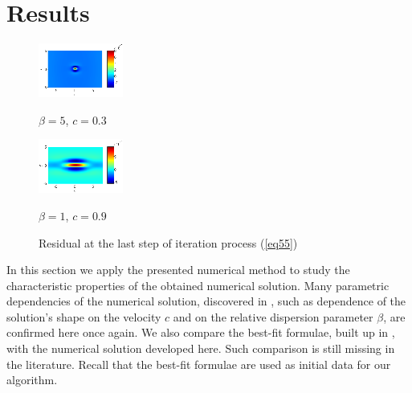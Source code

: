 \documentclass[preprint]{elsarticle}
\newcommand{\rf}[1]{(\ref{#1})}
\begin{document}
\section{Results}\label{results}
\begin{figure}[htbp]
	\begin{minipage}[b]{0.5\linewidth}
		 \centering
		\includegraphics[width=\linewidth]{residual/residual_bt5c03.eps}
		\centerline{$\beta = 5$, $c = 0.3$}
	\end{minipage}	
	\begin{minipage}[b]{0.5\linewidth}
		\centering
		 \includegraphics[width=\linewidth]{residual/residual_bt1c09.eps}
	\centerline{$\beta = 1$, $c = 0.9$ }
	\end{minipage}
		\caption{Residual at the last step of iteration process \rf{eq55} }
		\label{resid}
\end{figure}
In this section we apply the presented  numerical method  to study the characteristic properties of the obtained numerical solution.  Many parametric dependencies of the numerical solution,  discovered in \cite{Ch2011,Ch2012}, such as dependence of the solution's shape on the velocity $c$ and on the relative dispersion parameter $\beta$, are confirmed here once again.
 We   also compare  the best-fit  formulae,  built up in \cite{Ch2011}, with the numerical solution  developed here. Such comparison is still missing in the literature.
Recall that the best-fit formulae   are used as initial data for our algorithm. 
\end{document}
